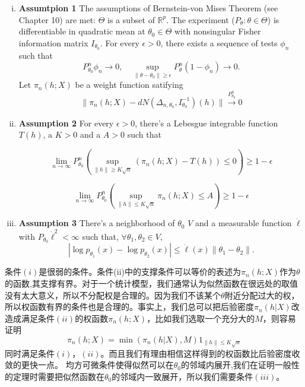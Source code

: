 \documentclass[review]{elsarticle}
\begin{document}
\begin{enumerate}[(i)]
    \item
        \textbf{Assumtpion 1} The assumptions of Bernstein-von Mises Theorem (see \cite{van2000asymptotic} Chapter 10) are met:  $\Theta$ is a subset of $\mathbb{R}^p$. The experiment ($P_{\theta}:\theta\in\Theta$) is differentiable in quadratic mean at $\theta_0\in \Theta$ with nonsingular Fisher information matrix $I_{\theta_0}$. For every $\epsilon>0$, there exists a sequence of tests $\phi_n$ such that
        \begin{equation}
            P_{\theta_0}^n\phi_n\to 0,\quad \sup_{\|\theta-\theta_0\|\geq \epsilon} P_\theta^n(1-\phi_n)\to 0.
        \end{equation}
        Let $\pi_n(h;X)$ be a weight function satifying 
        \begin{equation}
            \|\pi_n(h;X)-dN(\Delta_{n,\theta_0},I_{\theta_0}^{-1})(h)\|\overset{P_{\theta_0}^n}{\to}0
        \end{equation}
    \item
        
        

        \textbf{Assumption 2} For every $\epsilon>0$, there's a Lebesgue integrable function $T(h)$, a $K>0$ and a $A>0$ such that 

\begin{equation}
    \lim_{n\to \infty}P_{\theta_0}^n(\sup_{\|h\|\geq K\sqrt{n}}(\pi_n(h;X)-T(h))\leq 0)\geq 1-\epsilon
\end{equation}

        \begin{equation}
            \lim_{n\to \infty} P_{\theta_0}^n(\sup_{\|h\|\leq K\sqrt{n}} \pi_n(h;X)\leq A)\geq 1-\epsilon
        \end{equation}


    \item
        \textbf{Assumption 3}
        There's a neighborhood of $\theta_0$ $V$ and a measurable function $\dot{\ell}$ with $P_{\theta_0}\dot{\ell}^2<\infty$ such that, $\forall \theta_1,\theta_2\in V$,
        \begin{equation}
            |\log p_{\theta_1}(x)-\log p_{\theta_2}(x)|\leq \dot{\ell}(x)\|\theta_1-\theta_2\|.
        \end{equation}
\end{enumerate}

条件$(i)$是很弱的条件。条件(ii)中的支撑条件可以等价的表述为$\pi_n(h;X)$作为$\theta$的函数,其支撑有界。对于一个统计模型，我们通常认为似然函数在很远处的取值没有太大意义，所以不分配权是合理的。因为我们不该某个$\theta$附近分配过大的权，所以权函数有界的条件也是合理的。事实上，我们总可以把后验密度$\pi_n(h|X)$改造成满足条件$(ii)$的权函数$\pi_n(h;X)$，比如我们选取一个充分大的$M$，则容易证明
\begin{equation}
    \pi_n(h;X)=\min(\pi_n(h|X),M) 1_{\|h\|\leq K\sqrt{n}}
\end{equation}
同时满足条件$(i)$，$(ii)$。而且我们有理由相信这样得到的权函数比后验密度收敛的更快一点。
均方可微条件使得似然可以在$\theta_0$的邻域内展开,我们在证明一般性的定理时需要把似然函数在$\theta_0$的邻域内一致展开，所以我们需要条件$(iii)$。
\end{document}
